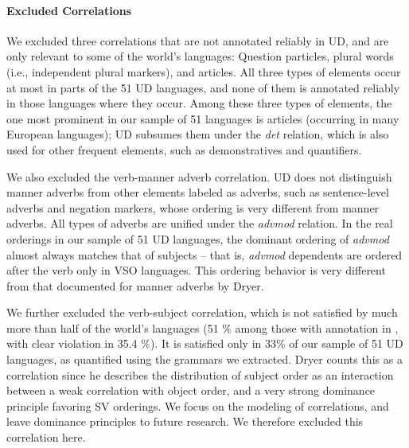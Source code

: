 \documentclass[10pt,twoside,lineno]{article}
\begin{document}
\paragraph{Excluded Correlations}
We excluded three correlations that are not annotated reliably in UD, and are only relevant to some of the world's languages: Question particles, plural words (i.e., independent plural markers), and articles.
All three types of elements occur at most in parts of the 51 UD languages, and none of them is annotated reliably in those languages where they occur.
Among these three types of elements, the one most prominent in our sample of 51 languages is articles (occurring in many European languages); UD subsumes them under the \emph{det} relation, which is also used for other frequent elements, such as demonstratives and quantifiers.

We also excluded the verb-manner adverb correlation.
UD does not distinguish manner adverbs from other elements labeled as adverbs, such as sentence-level adverbs and negation markers, whose ordering is very different from manner adverbs.
All types of adverbs are unified under the \emph{advmod} relation.
In the real orderings in our sample of 51 UD languages, the dominant ordering of \emph{advmod} almost always matches that of subjects -- that is, \emph{advmod} dependents are ordered after the verb only in VSO languages.
This ordering behavior is very different from that documented for manner adverbs by Dryer.



We further excluded the verb-subject correlation, which is not satisfied by much more than half of the world's languages (51 \% among those with annotation in \cite{wals-81}, with clear violation in 35.4 \%).
It is satisfied only in 33\% of our sample of 51 UD languages, as quantified using the grammars we extracted.
Dryer \cite{dryer1992greenbergian} counts this as a correlation since he describes the distribution of subject order as an interaction between a weak correlation with object order, and a very strong dominance principle favoring SV orderings.
We focus on the modeling of correlations, and leave dominance principles to future research.
We therefore excluded this correlation here.
\end{document}
